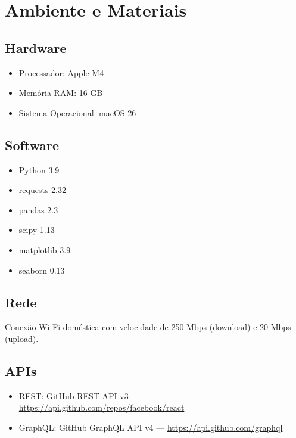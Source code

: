 \section{Ambiente e Materiais}

\subsection{Hardware}

\begin{itemize}
    \item Processador: Apple M4
    \item Memória RAM: 16 GB
    \item Sistema Operacional: macOS 26
\end{itemize}

\subsection{Software}

\begin{itemize}
    \item Python 3.9
    \item requests 2.32
    \item pandas 2.3
    \item scipy 1.13
    \item matplotlib 3.9
    \item seaborn 0.13
\end{itemize}

\subsection{Rede}

Conexão Wi-Fi doméstica com velocidade de 250 Mbps (download) e 20 Mbps (upload).

\subsection{APIs}

\begin{itemize}
    \item REST: GitHub REST API v3 --- \url{https://api.github.com/repos/facebook/react}
    \item GraphQL: GitHub GraphQL API v4 --- \url{https://api.github.com/graphql}
\end{itemize}

